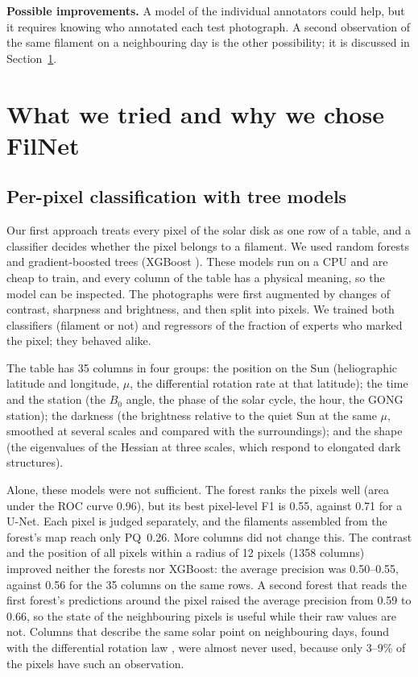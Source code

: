\documentclass[sigconf]{acmart}
\begin{document}
\textbf{Possible improvements.} A model of the individual annotators \cite{tanno2019learning} could help, but it requires knowing who annotated each test photograph. A second observation of the same filament on a neighbouring day is the other possibility; it is discussed in Section~\ref{sec:other}.


\section{What we tried and why we chose FilNet}\label{sec:other}

\subsection{Per-pixel classification with tree models}
Our first approach treats every pixel of the solar disk as one row of a table, and a classifier decides whether the pixel belongs to a filament. We used random forests \cite{breiman2001random} and gradient-boosted trees (XGBoost \cite{chen2016xgboost}). These models run on a CPU and are cheap to train, and every column of the table has a physical meaning, so the model can be inspected. The photographs were first augmented by changes of contrast, sharpness and brightness, and then split into pixels. We trained both classifiers (filament or not) and regressors of the fraction of experts who marked the pixel; they behaved alike.

The table has 35 columns in four groups: the position on the Sun (heliographic latitude and longitude, $\mu$, the differential rotation rate at that latitude); the time and the station (the $B_0$ angle, the phase of the solar cycle, the hour, the GONG station); the darkness (the brightness relative to the quiet Sun at the same $\mu$, smoothed at several scales and compared with the surroundings); and the shape (the eigenvalues of the Hessian at three scales, which respond to elongated dark structures).

Alone, these models were not sufficient. The forest ranks the pixels well (area under the ROC curve 0.96), but its best pixel-level F1 is 0.55, against 0.71 for a U-Net. Each pixel is judged separately, and the filaments assembled from the forest's map reach only PQ~0.26. More columns did not change this. The contrast and the position of all pixels within a radius of 12 pixels (1358 columns) improved neither the forests nor XGBoost: the average precision was 0.50--0.55, against 0.56 for the 35 columns on the same rows. A second forest that reads the first forest's predictions around the pixel raised the average precision from 0.59 to 0.66, so the state of the neighbouring pixels is useful while their raw values are not. Columns that describe the same solar point on neighbouring days, found with the differential rotation law \cite{snodgrass1990rotation}, were almost never used, because only 3--9\% of the pixels have such an observation.
\end{document}
